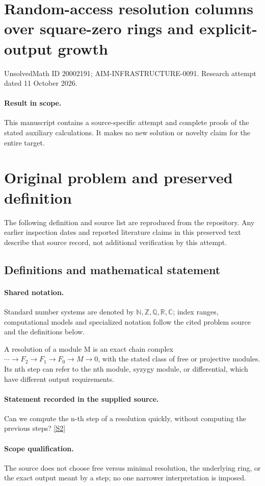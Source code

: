 \documentclass[11pt]{article}
\begin{document}
\section*{Random-access resolution columns over square-zero rings and explicit-output growth}
\noindent UnsolvedMath ID 20002191; AIM-INFRASTRUCTURE-0091. Research attempt dated 11 October 2026.
\paragraph{Result in scope.}This manuscript contains a source-specific attempt and complete proofs of the stated auxiliary calculations. It makes no new solution or novelty claim for the entire target.
\section{Original problem and preserved definition}
The following definition and source list are reproduced from the repository. Any earlier inspection dates and reported literature claims in this preserved text describe that source record, not additional verification by this attempt.
\subsection{Definitions and mathematical statement}

\paragraph{Shared notation.}Standard number systems are denoted by $\mathbb N,\mathbb Z,\mathbb Q,\mathbb R,\mathbb C$; index ranges, computational models and specialized notation follow the cited problem source and the definitions below.


A resolution of a module M is an exact chain complex $\cdots\to F_2\to F_1\to F_0\to M\to0$, with the stated class of free or projective modules. Its nth step can refer to the nth module, syzygy module, or differential, which have different output requirements.
\paragraph{Statement recorded in the supplied source.}
Can we compute the n-th step of a resolution quickly, without computing the previous steps? \href{http://aimpl.org/macaulay2efie/3/}{[S2]}
\paragraph{Scope qualification.}
The source does not choose free versus minimal resolution, the underlying ring, or the exact output meant by a step; no one narrower interpretation is imposed.
\end{document}
